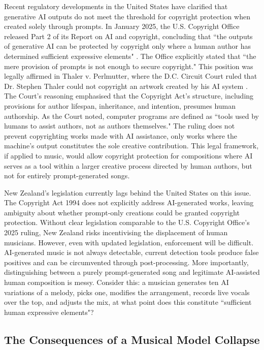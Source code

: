\documentclass{article}
\begin{document}
Recent regulatory developments in the United States have clarified that generative AI outputs do not meet the threshold for copyright protection when created solely through prompts. In January 2025, the U.S. Copyright Office released Part 2 of its Report on AI and copyright, concluding that ``the outputs of generative AI can be protected by copyright only where a human author has determined sufficient expressive elements" \cite{usco_newsnet_1060}. The Office explicitly stated that ``the mere provision of prompts is not enough to secure copyright." This position was legally affirmed in Thaler v. Perlmutter, where the D.C. Circuit Court ruled that Dr. Stephen Thaler could not copyright an artwork created by his AI system \cite{cadc_2025_23_5233}. The Court's reasoning emphasised that the Copyright Act's structure, including provisions for author lifespan, inheritance, and intention, presumes human authorship. As the Court noted, computer programs are defined as ``tools used by humans to assist authors, not as authors themselves." The ruling does not prevent copyrighting works made with AI assistance, only works where the machine's output constitutes the sole creative contribution. This legal framework, if applied to music, would allow copyright protection for compositions where AI serves as a tool within a larger creative process directed by human authors, but not for entirely prompt-generated songs.

New Zealand's legislation currently lags behind the United States on this issue. The Copyright Act 1994 does not explicitly address AI-generated works, leaving ambiguity about whether prompt-only creations could be granted copyright protection. Without clear legislation comparable to the U.S. Copyright Office's 2025 ruling, New Zealand risks incentivising the displacement of human musicians. However, even with updated legislation, enforcement will be difficult. AI-generated music is not always detectable, current detection tools produce false positives and can be circumvented through post-processing. More importantly, distinguishing between a purely prompt-generated song and legitimate AI-assisted human composition is messy. Consider this: a musician generates ten AI variations of a melody, picks one, modifies the arrangement, records live vocals over the top, and adjusts the mix, at what point does this constitute ``sufficient human expressive elements"?

\subsection{The Consequences of a Musical Model Collapse}
\end{document}
